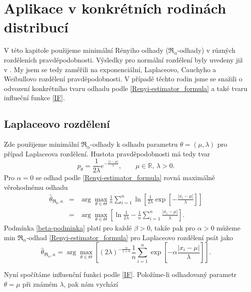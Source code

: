 
\chapter{Aplikace v konkrétních rodinách distribucí}

V této kapitole použijeme minimální Rényiho odhady ($\mathfrak{R}_\alpha$-odhady) v různých rozděleních pravděpodobnosti. Výsledky pro normální rozdělení byly uvedeny již v \cite{Demut2010}. My jsem se tedy zaměřili na exponenciální, Laplaceovo, Cauchyho a Weibullovo rozdělení pravděpodobnosti. V případě těchto rodin jsme se snažili o odvození konkrétního tvaru odhadu podle \eqref{Renyi-estimator_formula} a také tvaru influeční funkce \eqref{IF}.

\section{Laplaceovo rozdělení} %

Zde použijeme minimální $\mathfrak{R}_\alpha$-odhady k odhadu parametru $\theta = (\mu,\lambda)$ pro případ Laplaceova rozdělení. Hustota pravděpodobnosti má tedy tvar
\begin{equation}
	p_\theta = \frac{1}{2\lambda} e^{-\frac{|x-\mu|}{\lambda}}, \qquad \mu\in \mathbb{R},\, \lambda>0.
\end{equation}
Pro $\alpha = 0$ se odhad podle \eqref{Renyi-estimator_formula} rovná maximálně věrohodnému odhadu
\begin{eqnarray}
	\hat{\theta}_{\mathfrak{R}_0,n} & = & \arg \max_{\theta \in \Theta} \frac{1}{n} \sum^n_{i=1} \ln \left[ \frac{1}{2\lambda}\exp \left[-\frac{|x_i-\mu|}{\lambda} \right] \right] \nonumber \\
	& = & \arg \max_{\theta \in \Theta} \left[ \ln \frac{1}{2\lambda} - \frac{1}{n} \sum^n_{i=1} \frac{|x_i-\mu|}{\lambda} \right].
\end{eqnarray}
Podmínka \ref{beta-podminka} platí pro každé $\beta>0$, takže pak pro $\alpha>0$ můžeme  min $\mathfrak{R}_\alpha$-odhad \eqref{Renyi-estimator_formula} pro Laplaceovo rozdělení psát jako 
\begin{equation}
	\hat{\theta}_{\mathfrak{R}_\alpha,n} = \arg \max_{\theta \in \Theta} \left[ (2\lambda)^{-\frac{\alpha}{1+\alpha}} \frac{1}{n} \sum_{i=1}^n \exp \left[-\alpha\frac{|x_i-\mu|}{\lambda} \right] \right].
	\label{renyi-formula-laplace}
\end{equation}

Nyní spočítáme influenční funkci podle \eqref{IF}. Položíme-li odhadovaný parametr $\theta = \mu$ při známém $\lambda$, pak nám vychází 

